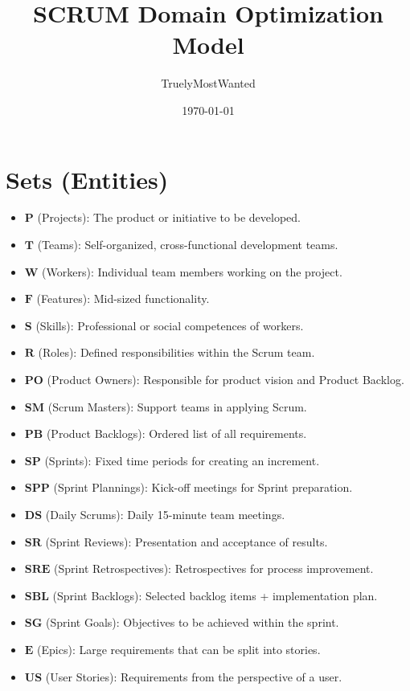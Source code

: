 \documentclass[11pt,a4paper]{article}
\title{SCRUM Domain Optimization Model}
\author{TruelyMostWanted}
\date{\today}
\begin{document}
\maketitle
\tableofcontents
\newpage

\section{Sets (Entities)}
\begin{itemize}[leftmargin=2em]
  \item $\mathbf{P}$ (Projects): The product or initiative to be developed.
  \item $\mathbf{T}$ (Teams): Self-organized, cross-functional development teams.
  \item $\mathbf{W}$ (Workers): Individual team members working on the project.
  \item $\mathbf{F}$ (Features): Mid-sized functionality.
  \item $\mathbf{S}$ (Skills): Professional or social competences of workers.
  \item $\mathbf{R}$ (Roles): Defined responsibilities within the Scrum team.
  \item $\mathbf{PO}$ (Product Owners): Responsible for product vision and Product Backlog.
  \item $\mathbf{SM}$ (Scrum Masters): Support teams in applying Scrum.
  \item $\mathbf{PB}$ (Product Backlogs): Ordered list of all requirements.
  \item $\mathbf{SP}$ (Sprints): Fixed time periods for creating an increment.
  \item $\mathbf{SPP}$ (Sprint Plannings): Kick-off meetings for Sprint preparation.
  \item $\mathbf{DS}$ (Daily Scrums): Daily 15-minute team meetings.
  \item $\mathbf{SR}$ (Sprint Reviews): Presentation and acceptance of results.
  \item $\mathbf{SRE}$ (Sprint Retrospectives): Retrospectives for process improvement.
  \item $\mathbf{SBL}$ (Sprint Backlogs): Selected backlog items + implementation plan.
  \item $\mathbf{SG}$ (Sprint Goals): Objectives to be achieved within the sprint.
  \item $\mathbf{E}$ (Epics): Large requirements that can be split into stories.
  \item $\mathbf{US}$ (User Stories): Requirements from the perspective of a user.

\end{itemize}
\end{document}
